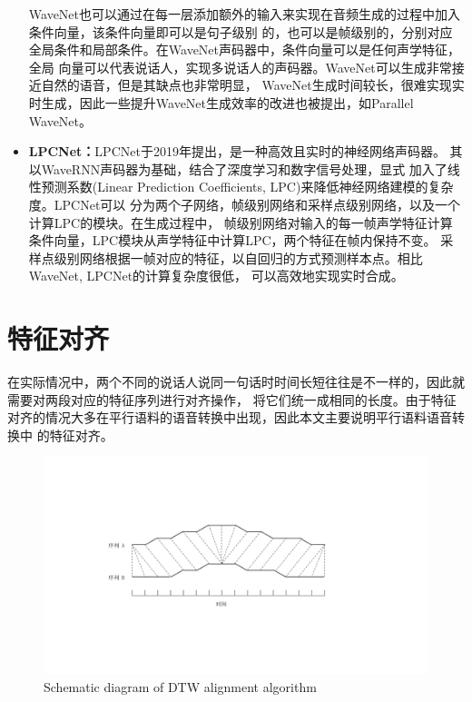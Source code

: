 \begin{itemize}
    WaveNet也可以通过在每一层添加额外的输入来实现在音频生成的过程中加入条件向量，该条件向量即可以是句子级别
    的，也可以是帧级别的，分别对应全局条件和局部条件。在WaveNet声码器中，条件向量可以是任何声学特征，全局
    向量可以代表说话人，实现多说话人的声码器。WaveNet可以生成非常接近自然的语音，但是其缺点也非常明显，
    WaveNet生成时间较长，很难实现实时生成，因此一些提升WaveNet生成效率的改进也被提出，如Parallel WaveNet\cite{oord2017parallel}。
    
    \item \textbf{LPCNet：}LPCNet于2019年提出，是一种高效且实时的神经网络声码器。
    其以WaveRNN声码器\cite{kalchbrenner2018efficient}为基础，结合了深度学习和数字信号处理，显式
    加入了线性预测系数(Linear Prediction Coefficients, LPC)来降低神经网络建模的复杂度。LPCNet可以
    分为两个子网络，帧级别网络和采样点级别网络，以及一个计算LPC的模块。在生成过程中，
    帧级别网络对输入的每一帧声学特征计算条件向量，LPC模块从声学特征中计算LPC，两个特征在帧内保持不变。
    采样点级别网络根据一帧对应的特征，以自回归的方式预测样本点。相比WaveNet, LPCNet的计算复杂度很低，
    可以高效地实现实时合成。
\end{itemize}

\section{特征对齐}
在实际情况中，两个不同的说话人说同一句话时时间长短往往是不一样的，因此就需要对两段对应的特征序列进行对齐操作，
将它们统一成相同的长度。由于特征对齐的情况大多在平行语料的语音转换中出现，因此本文主要说明平行语料语音转换中
的特征对齐。

\begin{figure}[!htp]
    \centering
    \includegraphics[width=13cm,trim=100 120 150 90,clip]{figure/2_dtw.pdf}
    {Schematic diagram of DTW alignment algorithm}
    \label{fig:dtw}
\end{figure}

